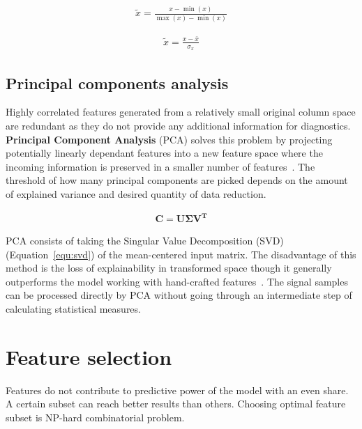 \begin{ceqn}\begin{align}
\widetilde{x} = \frac{x - \min(x)}{\max(x) - \min(x)}
\label{equ:min-max-scaler}
\end{align}\end{ceqn}

\begin{ceqn}\begin{align}
\widetilde{x} = \frac{x - \bar{x}}{\sigma_x}
\label{equ:standardization-scaler}
\end{align}\end{ceqn}


\subsection{Principal components analysis}
Highly correlated features generated from a relatively small original column space are redundant as they do not provide any additional information for diagnostics. \textbf{Principal Component Analysis} (PCA) solves this problem by projecting potentially linearly dependant features into a new feature space where the incoming information is preserved in a smaller number of features~\cite{zheng_feature_2018}. The threshold of how many principal components are picked depends on the amount of explained variance and desired quantity of data reduction. 

\begin{ceqn}\begin{align}
\mathbf{C} = \mathbf{U \Sigma V^T}
\label{equ:svd}
\end{align}\end{ceqn}

PCA consists of taking the Singular Value Decomposition (SVD) (Equation~\ref{equ:svd}) of the mean-centered input matrix. The disadvantage of this method is the loss of explainability in transformed space though it generally outperforms the model working with hand-crafted features~\cite{brito_fault_2021}. The signal samples can be processed directly by PCA without going through an intermediate step of calculating statistical measures. 

\section{Feature selection}
Features do not contribute to predictive power of the model with an even share. A certain subset can reach better results than others. Choosing optimal feature subset is NP-hard combinatorial problem.

